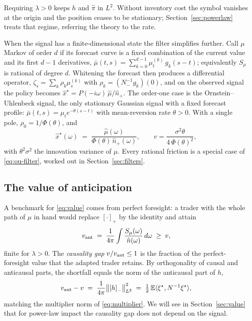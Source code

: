 \documentclass[11pt]{article}
\newcommand{\E}{\mathbb{E}}
\newcommand{\pluspart}[1]{\left[#1\right]_+}
\newcommand{\minuspart}[1]{\left[#1\right]_-}
\theoremstyle{plain}
\theoremstyle{definition}
\theoremstyle{remark}
\begin{document}
Requiring $\lambda>0$ keeps $h$ and $\hat\pi$ in $L^2$. Without inventory cost the symbol vanishes at the origin and the position ceases to be stationary; Section~\ref{sec:powerlaw} treats that regime, referring the theory to the rate.

When the signal has a finite-dimensional state the filter simplifies further. Call $\mu$ Markov of order $d$ if its forecast curve is a fixed combination of the current value and its first $d-1$ derivatives, $\bar\mu(t,s)=\sum_{k=0}^{d-1}\mu^{(k)}_t\,g_k(s-t)$; equivalently $S_\mu$ is rational of degree $d$. Whitening the forecast then produces a differential operator, $\zeta_s=\sum_k\rho_k\mu^{(k)}_s$ with $\rho_k=(N_-^{-1}g_k)(0)$, and on the observed signal the policy becomes $\hat x^\star=P(-i\omega)\,\hat\mu/\hat n_+$. The order-one case is the Ornstein--Uhlenbeck signal, the only stationary Gaussian signal with a fixed forecast profile: $\bar\mu(t,s)=\mu_t e^{-\theta(s-t)}$ with mean-reversion rate $\theta>0$. With a single pole, $\rho_0=1/\Phi(\theta)$, and
\begin{equation}\label{eq:ou-filter}
\hat x^\star(\omega) \;=\; \frac{\hat\mu(\omega)}{\Phi(\theta)\,\hat n_+(\omega)},
\qquad v = \frac{\sigma^2\theta}{4\,\Phi(\theta)^2},
\end{equation}
with $\theta^2\sigma^2$ the innovation variance of $\mu$. Every rational friction is a special case of \eqref{eq:ou-filter}, worked out in Section~\ref{sec:filters}.

\subsection{The value of anticipation}\label{sec:value-general}

A benchmark for \eqref{eq:value} comes from perfect foresight: a trader with the whole path of $\mu$ in hand would replace $\pluspart{\cdot}$ by the identity and attain
\begin{equation}\label{eq:vant}
v_{\rm ant} \;=\; \frac{1}{4\pi}\int\frac{S_\mu(\omega)}{\hat n(\omega)}\,d\omega \;\ge\; v ,
\end{equation}
finite for $\lambda>0$. The \emph{causality gap} $v/v_{\rm ant}\le1$ is the fraction of the perfect-foresight value that the adapted trader retains. By orthogonality of causal and anticausal parts, the shortfall equals the norm of the anticausal part of $h$,
\[
v_{\rm ant}-v \;=\; \frac{1}{4\pi}\bigl\|\minuspart{h}\bigr\|_{L^2}^2 \;=\; \tfrac12\,\E\langle\xi^\star,N^{-1}\xi^\star\rangle ,
\]
matching the multiplier norm of \eqref{eq:multiplier}. We will see in Section~\ref{sec:value} that for power-law impact the causality gap does not depend on the signal.
\end{document}
